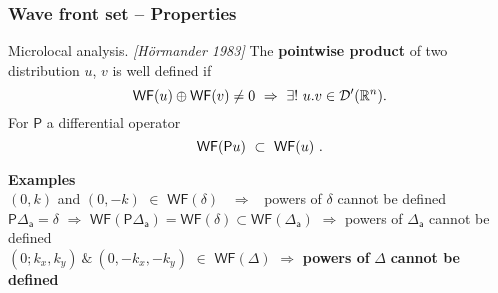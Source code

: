 \documentclass[9pt]{beamer}
\newcommand{\WF}{\mathsf{WF}} %
\newcommand{\citebeam}[1]{\textit{\textcolor{black!60!white}{[#1]}}} %
\newcommand{\Psf}{\mathsf{P}}
\newcommand{\asf}{\mathsf{a}}
\begin{document}
\begin{frame}

\frametitle{Wave front set -- Properties}

\vfill

\begin{block}{Microlocal analysis. \citebeam{Hörmander 1983}}
The \textbf{pointwise product} of two distribution $u$, $v$ is well defined if 
\vspace*{-10pt}
\begin{equation*}
\WF(u) \oplus \WF(v) \neq 0 \ \Rightarrow \ \exists! \ u.v \in \mathcal{D}^{\prime}(\mathbb{R}^n). 
\vspace*{-10pt}
\end{equation*}
For $\Psf$ a differential operator
\vspace*{-12pt}
\begin{equation*}
\WF(\Psf u) \ \subset  \ \WF(u) \ .
\vspace*{-8pt}
\end{equation*}
\end{block}

\vfill

\textbf{Examples} \\[4pt]

$(0,k)$ and $(0,-k)$ $\in$ $\WF(\delta)$ \ $\Rightarrow$ \ powers of $\delta$ cannot be defined \\[3pt]
$\Psf \Delta_\asf = \delta$ $\Rightarrow$ $\WF(\Psf \Delta_\asf) = \WF(\delta) \subset \WF(\Delta_\asf)$ $\Rightarrow$ powers of $\Delta_\asf$ cannot be defined \\[8pt]

$(0;k_x,k_y) \ \& \ (0,-k_x,-k_y)$ $\in$ $\WF(\Delta)$ $\Rightarrow$ \textbf{powers of} $\Delta$ \textbf{cannot be defined} \ \textdbend

\vfill

\end{frame} 

\end{document}
